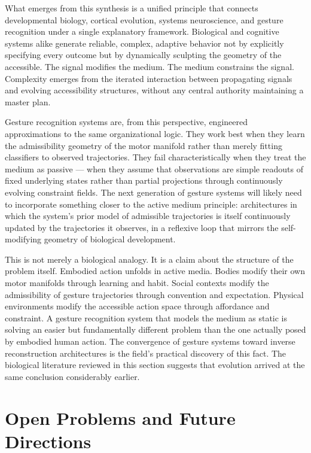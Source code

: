 \documentclass[11pt, a4paper]{article}
\theoremstyle{definition}
\begin{document}
What emerges from this synthesis is a unified principle that connects developmental biology, cortical evolution, systems neuroscience, and gesture recognition under a single explanatory framework. Biological and cognitive systems alike generate reliable, complex, adaptive behavior not by explicitly specifying every outcome but by dynamically sculpting the geometry of the accessible. The signal modifies the medium. The medium constrains the signal. Complexity emerges from the iterated interaction between propagating signals and evolving accessibility structures, without any central authority maintaining a master plan.

Gesture recognition systems are, from this perspective, engineered approximations to the same organizational logic. They work best when they learn the admissibility geometry of the motor manifold rather than merely fitting classifiers to observed trajectories. They fail characteristically when they treat the medium as passive --- when they assume that observations are simple readouts of fixed underlying states rather than partial projections through continuously evolving constraint fields. The next generation of gesture systems will likely need to incorporate something closer to the active medium principle: architectures in which the system's prior model of admissible trajectories is itself continuously updated by the trajectories it observes, in a reflexive loop that mirrors the self-modifying geometry of biological development.

This is not merely a biological analogy. It is a claim about the structure of the problem itself. Embodied action unfolds in active media. Bodies modify their own motor manifolds through learning and habit. Social contexts modify the admissibility of gesture trajectories through convention and expectation. Physical environments modify the accessible action space through affordance and constraint. A gesture recognition system that models the medium as static is solving an easier but fundamentally different problem than the one actually posed by embodied human action. The convergence of gesture systems toward inverse reconstruction architectures is the field's practical discovery of this fact. The biological literature reviewed in this section suggests that evolution arrived at the same conclusion considerably earlier.

\section{Open Problems and Future Directions}
\end{document}
